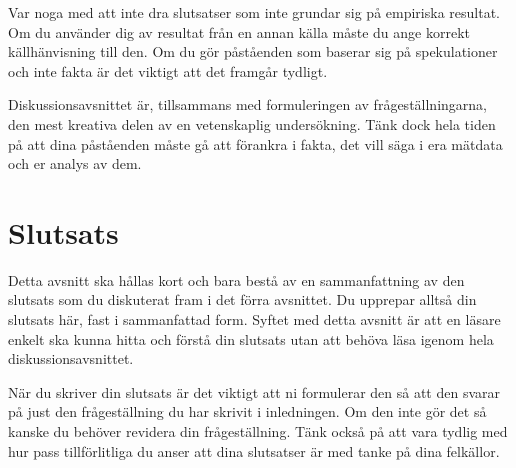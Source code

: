 \documentclass{article}
\begin{document}
Var noga med att inte dra slutsatser som inte grundar sig på empiriska resultat. Om du använder dig av resultat från en annan källa måste du ange korrekt källhänvisning till den. Om du gör påståenden som baserar sig på spekulationer och inte fakta är det viktigt att det framgår tydligt.

Diskussionsavsnittet är, tillsammans med formuleringen av frågeställningarna, den mest kreativa delen av en vetenskaplig undersökning. Tänk dock hela tiden på att dina påståenden måste gå att förankra i fakta, det vill säga i era mätdata och er analys av dem.

\section{Slutsats}
Detta avsnitt ska hållas kort och bara bestå av en sammanfattning av den slutsats som du diskuterat fram i det förra avsnittet. Du upprepar alltså din slutsats här, fast i sammanfattad form. Syftet med detta avsnitt är att en läsare enkelt ska kunna hitta och förstå din slutsats utan att behöva läsa igenom hela diskussionsavsnittet.

När du skriver din slutsats är det viktigt att ni formulerar den så att den svarar på just den frågeställning du har skrivit i inledningen. Om den inte gör det så kanske du behöver revidera din frågeställning. Tänk också på att vara tydlig med hur pass tillförlitliga du anser att dina slutsatser är med tanke på dina felkällor.
\clearpage
~\cite{wiki:graf}
~\cite{wiki:set}
~\cite{bk:asymptotic_analysis}
{}

\end{document}

